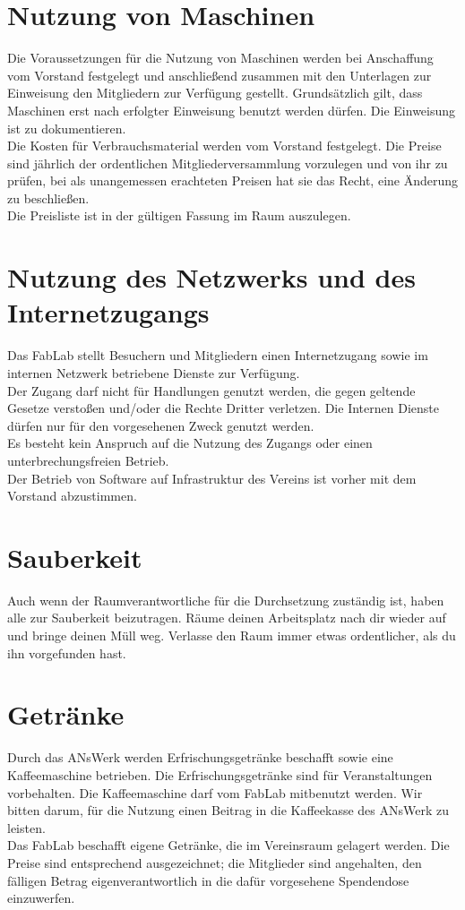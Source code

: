 \section{Nutzung von Maschinen}
Die Voraussetzungen für die Nutzung von Maschinen werden bei Anschaffung vom Vorstand festgelegt und anschließend zusammen mit den Unterlagen zur Einweisung den Mitgliedern zur Verfügung gestellt. Grundsätzlich gilt, dass Maschinen erst nach erfolgter Einweisung benutzt werden dürfen. Die Einweisung ist zu dokumentieren.\\
Die Kosten für Verbrauchsmaterial werden vom Vorstand festgelegt. Die Preise sind jährlich der ordentlichen Mitgliederversammlung vorzulegen und von ihr zu prüfen, bei als unangemessen erachteten Preisen hat sie das Recht, eine Änderung zu beschließen. \\
Die Preisliste ist in der gültigen Fassung im Raum auszulegen.

\section{Nutzung des Netzwerks und des Internetzugangs}
Das FabLab stellt Besuchern und Mitgliedern einen Internetzugang sowie im internen Netzwerk betriebene Dienste zur Verfügung. \\
Der Zugang darf nicht für Handlungen genutzt werden, die gegen geltende Gesetze verstoßen und/oder die Rechte Dritter verletzen. Die Internen Dienste dürfen nur für den vorgesehenen Zweck genutzt werden. \\
Es besteht kein Anspruch auf die Nutzung des Zugangs oder einen unterbrechungsfreien Betrieb. \\
Der Betrieb von Software auf Infrastruktur des Vereins ist vorher mit dem Vorstand abzustimmen. 

\section{Sauberkeit}
Auch wenn der Raumverantwortliche für die Durchsetzung zuständig ist, haben alle zur Sauberkeit beizutragen. Räume deinen Arbeitsplatz nach dir wieder auf und bringe deinen Müll weg. Verlasse den Raum immer etwas ordentlicher, als du ihn vorgefunden hast.

\section{Getränke}
Durch das ANsWerk werden Erfrischungsgetränke beschafft sowie eine Kaffeemaschine betrieben. Die Erfrischungsgetränke sind für Veranstaltungen vorbehalten. Die Kaffeemaschine darf vom FabLab mitbenutzt werden. Wir bitten darum, für die Nutzung einen Beitrag in die Kaffeekasse des ANsWerk zu leisten.\\
Das FabLab beschafft eigene Getränke, die im Vereinsraum gelagert werden. Die Preise sind entsprechend ausgezeichnet; die Mitglieder sind angehalten, den fälligen Betrag eigenverantwortlich in die dafür vorgesehene Spendendose einzuwerfen.

